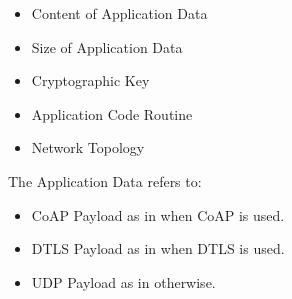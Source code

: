\begin{itemize}
	\item Content of Application Data
	\item Size of Application Data
	\item Cryptographic Key
	\item Application Code Routine
	\item Network Topology
\end{itemize}

The Application Data refers to:
\begin{itemize}
	\item CoAP Payload as in  when CoAP is used.
	\item DTLS Payload as in  when DTLS is used.
	\item UDP Payload as in  otherwise.
\end{itemize}

%
%
%
%

